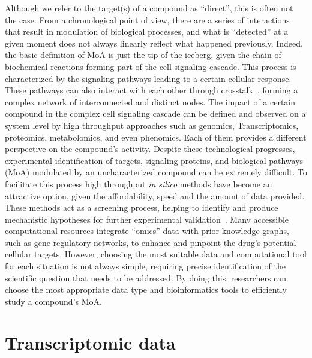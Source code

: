 Although we refer to the target(s) of a compound as “direct”, this is often not the case. 
From a chronological point of view, there are a series of interactions that result in modulation of biological processes, and what is “detected” at a given moment does not always linearly reflect what happened previously. 
Indeed, the basic definition of MoA is just the tip of the iceberg, given the chain of biochemical reactions forming part of the cell signaling cascade. 
This process is characterized by the signaling pathways leading to a certain cellular response. These pathways can also interact with each other through crosstalk~\cite{RN94}, forming a complex network of interconnected and distinct nodes. 
The impact of a certain compound in the complex cell signaling cascade can be defined and observed on a system level by high throughput approaches such as genomics, \gls{Transcriptomics}, proteomics, metabolomics, and even phenomics. 
Each of them provides a different perspective on the compound's activity. 
Despite these technological progresses, experimental identification of targets, signaling proteins, and biological pathways (\gls{MoA}) modulated by an uncharacterized compound can be extremely difficult. 
To facilitate this process high throughput \textit{in silico} methods have become an attractive option, given the affordability, speed and the amount of data provided. 
These methods act as a screening process, helping to identify and produce mechanistic hypotheses for further experimental validation~\cite{RN38}. 
Many accessible computational resources integrate “omics” data with prior knowledge graphs, such as gene regulatory networks, to enhance and pinpoint the drug's potential cellular targets. 
However, choosing the most suitable data and computational tool for each situation is not always simple, requiring precise identification of the scientific question that needs to be addressed. 
By doing this, researchers can choose the most appropriate data type and bioinformatics tools to efficiently study a compound's MoA.

\section{Transcriptomic data}
\label{sec:Transcriptomic_data}


